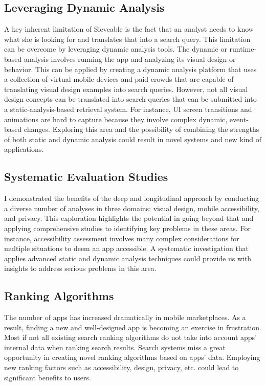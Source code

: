 \subsection*{Leveraging Dynamic Analysis}
A key inherent limitation of Sieveable is the fact that an analyst needs to know what she is looking for and translates that into a search query.
This limitation can be overcome by leveraging dynamic analysis tools.
The dynamic or runtime-based analysis involves running the app and analyzing its visual design or behavior.
This can be applied by creating a dynamic analysis platform that uses a collection of virtual mobile devices and paid crowds that are capable of translating visual design examples into search queries.
However, not all visual design concepts can be translated into search queries that can be submitted into a static-analysis-based retrieval system.
For instance, UI screen transitions and animations are hard to capture because they involve complex dynamic, event-based changes.
Exploring this area and the possibility of combining the strengths of both static and dynamic analysis could result in novel systems and new kind of applications.

\subsection*{Systematic Evaluation Studies}
I demonstrated the benefits of the deep and longitudinal approach by conducting a diverse number of analyses in three domains: visual design, mobile accessibility, and privacy. 
This exploration highlights the potential in going beyond that and applying comprehensive studies to identifying key problems in these areas.
For instance, accessibility assessment involves many complex considerations for multiple situations to deem an app accessible.
A systematic investigation that applies advanced static and dynamic analysis techniques could provide us with insights to address serious problems in this area.

\subsection*{Ranking Algorithms}
The number of apps has increased dramatically in mobile marketplaces.
As a result, finding a new and well-designed app is becoming an exercise in frustration.
Most if not all existing search ranking algorithms do not take into account apps' internal data when ranking search results.
Search systems miss a great opportunity in creating novel ranking algorithms based on apps' data.
Employing new ranking factors such as accessibility, design, privacy, etc. could lead to significant benefits to users.

